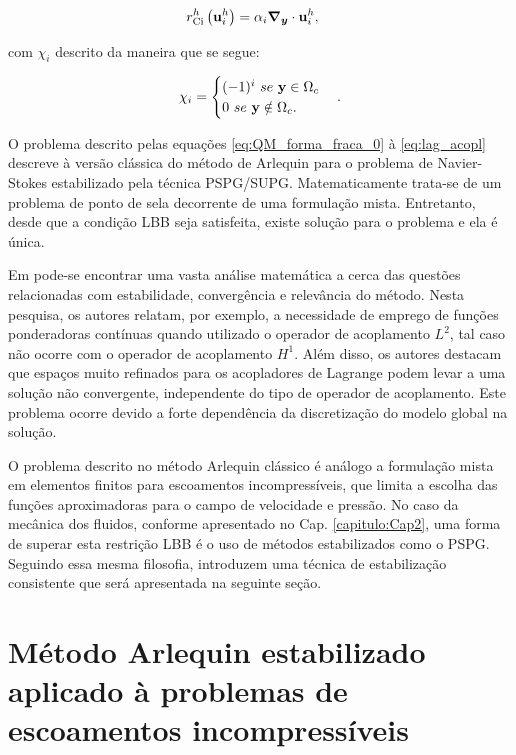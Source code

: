 \documentclass[tese_patricia]{subfiles}
\begin{document}
\noindent

\begin{align}
	r_{\mathrm{Ci}}^{h}\left(\mathbf{u}_i^{h}\right)&= \alpha_i \boldsymbol{\nabla_y} \cdot \mathbf{u}_i^{h} \label{eq:res_C_i}, 
\end{align}

\noindent com $\chi_{i}$ descrito da maneira que se segue:


\begin{align}
	\chi_{i} = \begin{cases} (-1)^{i} \ se \ \mathbf{y} \in \Omega_c \\
			   0 \ se \ \mathbf{y} \notin \Omega_c. \end{cases}						. 
\end{align}

O problema descrito pelas equações \ref{eq:QM_forma_fraca_0} à \ref{eq:lag_acopl} descreve à versão clássica do método de Arlequin para o problema de Navier-Stokes estabilizado pela técnica PSPG/SUPG. Matematicamente trata-se de um problema de ponto de sela decorrente de uma formulação mista. Entretanto, desde que a condição LBB seja satisfeita, existe solução para o problema e ela é única. 

Em  pode-se encontrar uma vasta análise matemática a cerca das questões relacionadas com estabilidade, convergência e relevância do método. Nesta pesquisa, os autores relatam, por exemplo, a necessidade de emprego de funções ponderadoras contínuas quando utilizado o operador de acoplamento $L^{2}$, tal caso não ocorre com o operador de acoplamento $H^{1}$. Além disso,  os autores destacam que espaços muito refinados para os acopladores de Lagrange podem levar a uma solução não convergente, independente do tipo de operador de acoplamento. Este problema ocorre devido a forte dependência da discretização do modelo global na solução.

O problema descrito no método Arlequin clássico é análogo a formulação mista em elementos finitos para escoamentos incompressíveis, que limita a escolha das funções aproximadoras para o campo de velocidade e pressão. No caso da mecânica dos fluidos, conforme apresentado no Cap. \ref{capitulo:Cap2}, uma forma de superar esta restrição LBB é o uso de métodos estabilizados como o PSPG. Seguindo essa mesma filosofia,   introduzem uma técnica de estabilização consistente que será apresentada na seguinte seção. 

\section{Método Arlequin estabilizado aplicado à problemas de escoamentos incompressíveis}
\end{document}
